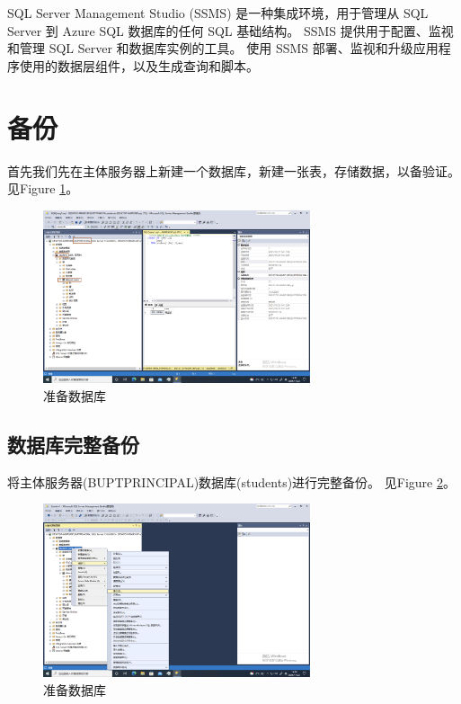 \documentclass[onecolumn,oneside]{BUPTHomework}
\begin{document}
  SQL Server Management Studio (SSMS) 是一种集成环境，用于管理从 SQL Server 到 Azure SQL 数据库的任何 SQL 基础结构。
  SSMS 提供用于配置、监视和管理 SQL Server 和数据库实例的工具。
  使用 SSMS 部署、监视和升级应用程序使用的数据层组件，以及生成查询和脚本。

  \section{备份}

  首先我们先在主体服务器上新建一个数据库，新建一张表，存储数据，以备验证。
  见Figure \ref{pic2}。

  \begin{figure}[h]
    \centering
    \includegraphics[width=0.70\textwidth]{image/pic2.png}
    \caption{准备数据库}
    \label{pic2}
  \end{figure}

  \subsection{数据库完整备份}

  将主体服务器(BUPTPRINCIPAL)数据库(students)进行完整备份。
  见Figure \ref{pic3}。

  \begin{figure}[h]
    \centering
    \includegraphics[width=0.70\textwidth]{image/pic3.png}
    \caption{准备数据库}
    \label{pic3}
  \end{figure}
\end{document}
